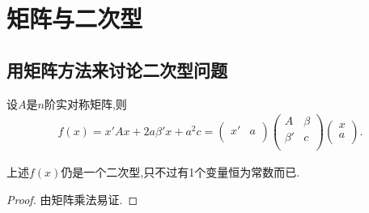 \documentclass[../../main.tex]{subfiles}%
\begin{document}
\section{矩阵与二次型}

\subsection{用矩阵方法来讨论二次型问题}

\begin{lemma}\label{lemma:一般二次型的矩阵形式}
设$A$是$n$阶实对称矩阵,则
\begin{align*}
f\left( x \right) =x' Ax+2a\beta ' x+a^2c=\left( \begin{matrix}
x'&		a\\
\end{matrix} \right) \left( \begin{matrix}
A&		\beta\\
\beta '&		c\\
\end{matrix} \right) \left( \begin{array}{c}
x\\
a\\
\end{array} \right) .
\end{align*}
\end{lemma}
\begin{remark}
上述$f(x)$仍是一个二次型,只不过有1个变量恒为常数而已.
\end{remark}
\begin{proof}

由矩阵乘法易证.

\end{proof}
\end{document}
